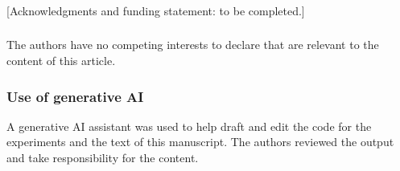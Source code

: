 \documentclass[runningheads]{llncs}
\begin{document}
\begin{credits}
\subsubsection{\ackname} [Acknowledgments and funding statement: to be completed.]

\subsubsection{\discintname}
The authors have no competing interests to declare that are relevant to the content of this article.

\subsubsection{Use of generative AI} A generative AI assistant was used to help draft and edit the code for the experiments and the text of this manuscript. The authors reviewed the output and take responsibility for the content.
\end{credits}
%
%


\end{document}
